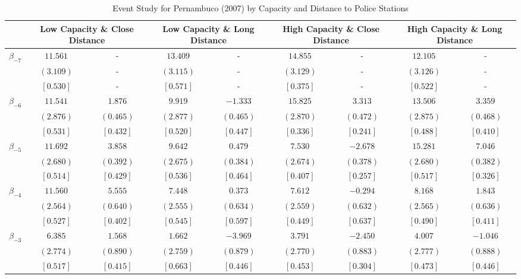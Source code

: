 \documentclass[12pt]{article}
\begin{document}
\begin{table}[h!]
\centering
\caption{Event Study for Pernambuco (2007) by Capacity and Distance to Police Stations}
\label{tab:event_study_PE_het}
\begin{adjustbox}{width=\textwidth}
\begin{tabular}{lcccccccc}
\toprule
& \multicolumn{2}{c}{Low Capacity \& Close Distance} & \multicolumn{2}{c}{Low Capacity \& Long Distance} & \multicolumn{2}{c}{High Capacity \& Close Distance} & \multicolumn{2}{c}{High Capacity \& Long Distance} \\
\cmidrule(lr){2-3} \cmidrule(lr){4-5} \cmidrule(lr){6-7} \cmidrule(lr){8-9}
\midrule
$\beta_{-7}$ & $ 11.561$ & - & $ 13.409$ & - & $ 14.855$ & - & $ 12.105$ & - \\
& $(  3.109)$ & - & $(  3.115)$ & - & $(  3.129)$ & - & $(  3.126)$ & - \\
& $[  0.530]$ & - & $[  0.571]$ & - & $[  0.375]$ & - & $[  0.522]$ & - \\

$\beta_{-6}$ & $ 11.541$ & $  1.876$ & $  9.919$ & $ -1.333$ & $ 15.825$ & $  3.313$ & $ 13.506$ & $  3.359$ \\
& $(  2.876)$ & $(  0.465)$ & $(  2.877)$ & $(  0.465)$ & $(  2.870)$ & $(  0.472)$ & $(  2.875)$ & $(  0.468)$ \\
& $[  0.531]$ & $[  0.432]$ & $[  0.520]$ & $[  0.447]$ & $[  0.336]$ & $[  0.241]$ & $[  0.488]$ & $[  0.410]$ \\

$\beta_{-5}$ & $ 11.692$ & $  3.858$ & $  9.642$ & $  0.479$ & $  7.530$ & $ -2.678$ & $ 15.281$ & $  7.046$ \\
& $(  2.680)$ & $(  0.392)$ & $(  2.675)$ & $(  0.384)$ & $(  2.674)$ & $(  0.378)$ & $(  2.680)$ & $(  0.382)$ \\
& $[  0.514]$ & $[  0.429]$ & $[  0.536]$ & $[  0.464]$ & $[  0.407]$ & $[  0.257]$ & $[  0.517]$ & $[  0.326]$ \\

$\beta_{-4}$ & $ 11.560$ & $  5.555$ & $  7.448$ & $  0.373$ & $  7.612$ & $ -0.294$ & $  8.168$ & $  1.843$ \\
& $(  2.564)$ & $(  0.640)$ & $(  2.555)$ & $(  0.634)$ & $(  2.559)$ & $(  0.632)$ & $(  2.565)$ & $(  0.636)$ \\
& $[  0.527]$ & $[  0.402]$ & $[  0.545]$ & $[  0.597]$ & $[  0.449]$ & $[  0.637]$ & $[  0.490]$ & $[  0.411]$ \\

$\beta_{-3}$ & $  6.385$ & $  1.568$ & $  1.662$ & $ -3.969$ & $  3.791$ & $ -2.450$ & $  4.007$ & $ -1.046$ \\
& $(  2.774)$ & $(  0.890)$ & $(  2.759)$ & $(  0.879)$ & $(  2.770)$ & $(  0.883)$ & $(  2.777)$ & $(  0.888)$ \\
& $[  0.517]$ & $[  0.415]$ & $[  0.663]$ & $[  0.446]$ & $[  0.453]$ & $[  0.304]$ & $[  0.473]$ & $[  0.446]$ \\


\end{tabular}
\end{adjustbox}
\end{table}
\end{document}
